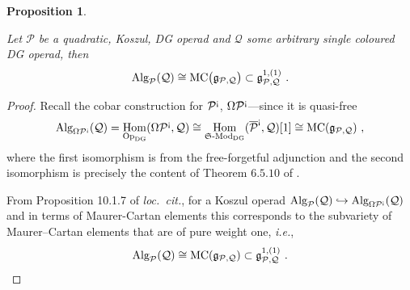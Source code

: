\documentclass[11pt]{amsart}
\numberwithin{equation}{section}
\newtheorem{prop}[theo]{Proposition}
\theoremstyle{definition}
\newcommand{\bb}{\mathbb}
\newcommand{\mc}{\mathcal}
\newcommand{\mf}{\mathfrak}
\DeclareMathOperator{\Hom}{Hom}
\newcommand{\Mod}{{\textup{-Mod}}}
\newcommand{\Alg}{{\textup{Alg}}}
\newcommand{\ash}{{\textup{\mbox{!`}}}}
\newcommand{\Op}{{\textup{Op}}}
\newcommand{\Ss}{{{\mf{S}}}}
\newcommand{\MC}{{{\textup{MC}}}}
\newcommand{\0}{{\textbf{0}}}
\newcommand{\DG}{{\textup{DG}}}
\newcommand{\Z}{\bb Z}
\def\PP{{\mc P}}
\def\QQ{{\mc Q}}
\def\gf{\mathfrak{g}}
\def \mf{\mathfrak}
\def \Op{\mathrm{Op}}
\def \ie{{\it i.e.}}
\begin{document}




\begin{prop}\label{MCplainprop}

Let $\PP$ be a quadratic, Koszul, DG operad	and $\QQ$ some arbitrary single coloured DG operad, then
\[
\Alg_\PP(\QQ) \cong \MC\big(\gf_{\PP,\QQ}\big)\subset \gf_{\PP,\QQ}^{1,(1)}~.
\]
\end{prop}
\begin{proof}
Recall the cobar construction for $\PP^\ash$, $\Omega \PP^\ash$---since it is quasi-free 
\[
\Alg_{\Omega\PP^\ash}(\QQ)=\Hom_{\Op_\DG}(\Omega\PP^\ash,\QQ) \cong \Hom_{\Ss\Mod_\DG}(\overline{\PP}^\ash,\QQ)[1] \cong \MC(\gf_{\PP,\QQ})~,
\]
where the first isomorphism is from the free-forgetful adjunction and the second isomorphism is precisely the content of Theorem $6.5.10$ of \cite{LV}.

From Proposition 10.1.7 of \emph{loc.\ cit.}, for a Koszul operad $\Alg_{\PP}(\QQ)\hookrightarrow \Alg_{\Omega\PP^\ash}(\QQ)$ and in terms of Maurer-Cartan elements this corresponds to the subvariety of Maurer--Cartan elements that are of pure weight one, \ie,
\[
\Alg_{\PP}(\QQ) \cong \MC(\gf_{\PP,\QQ})\subset \gf_{\PP,\QQ}^{1,(1)}~.
\]


\end{proof}
\end{document}

